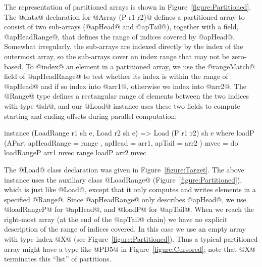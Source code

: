 The representation of partitioned arrays is shown in Figure~\ref{figure:Partitioned}. The @data@ declaration for @Array (P r1 r2)@ defines a partitioned array to consist of two sub-arrays (@apHead@ and @apTail@), together with a field, @apHeadRange@, that defines the range of indices covered by @apHead@.  Somewhat irregularly, the sub-arrays are indexed directly by the index of the outermost array, so the sub-arrays cover an index range that may not be zero-based.  To @index@ an element in a partitioned array, we use the @rangeMatch@ field of @apHeadRange@ to test whether its index is within the range of @apHead@ and if so index into @arr1@, otherwise we index into @arr2@.  The @Range@ type defines a rectangular range of elements between the two indices with type @sh@, and our @Load@ instance uses these two fields to compute starting and ending offsets during parallel computation:
\par
\begin{small}
\begin{code}
  instance (LoadRange r1 sh e, Load r2 sh e)
         => Load (P r1 r2) sh e where
   loadP (APart { apHeadRange = range
                , apHead = arr1,  apTail = arr2 }) mvec
    = do loadRangeP arr1 mvec range
         loadP      arr2 mvec 
\end{code}
\end{small}
%
The @Load@ class declaration was given in Figure~\ref{figure:Target}. The above instance uses the auxiliary class @LoadRange@ (Figure~\ref{figure:Partitioned}), which is just like @Load@, except that it only computes and writes elements in a specified @Range@. Since @apHeadRange@ only describes @apHead@, we use @loadRangeP@ for @apHead@, and @loadP@ for @apTail@. When we reach the right-most array (at the end of the @apTail@ chain) we have no explicit description of the range of indices covered. In this case we use an empty array with type index @X@ (see Figure~\ref{figure:Partitioned}). Thus a typical partitioned array might have a type like @PD5@ in Figure~\ref{figure:Cursored}; note that @X@ terminates this ``list'' of partitions. 

